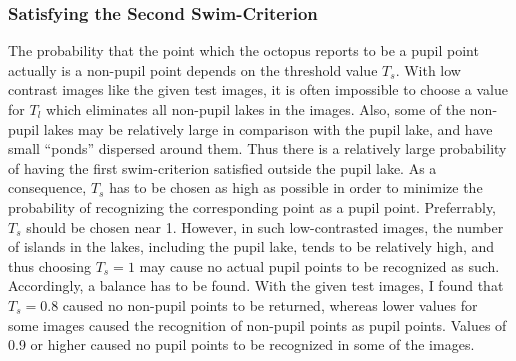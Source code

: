 
\subsubsection{Satisfying the Second Swim-Criterion}

The probability that the point which the octopus reports to be a pupil
point actually is a non-pupil point depends on the threshold value
$T_{s}$.  With low contrast images like the given test images, it is
often impossible to choose a value for $T_{l}$ which eliminates all
non-pupil lakes in the images.  Also, some of the non-pupil lakes may
be relatively large in comparison with the pupil lake, and have small
``ponds'' dispersed around them.  Thus there is a relatively large
probability of having the first swim-criterion satisfied outside the
pupil lake.  As a consequence, $T_{s}$ has to be chosen as high as
possible in order to minimize the probability of recognizing the
corresponding point as a pupil point.  Preferrably, $T_{s}$ should be
chosen near 1.  However, in such low-contrasted images, the number of
islands in the lakes, including the pupil lake, tends to be relatively
high, and thus choosing $T_{s}=1$ may cause no actual pupil points to
be recognized as such.  Accordingly, a balance has to be found.  With
the given test images, I found that $T_{s}=0.8$ caused no non-pupil
points to be returned, whereas lower values for some images caused the
recognition of non-pupil points as pupil points.  Values of 0.9 or
higher caused no pupil points to be recognized in some of the images.


